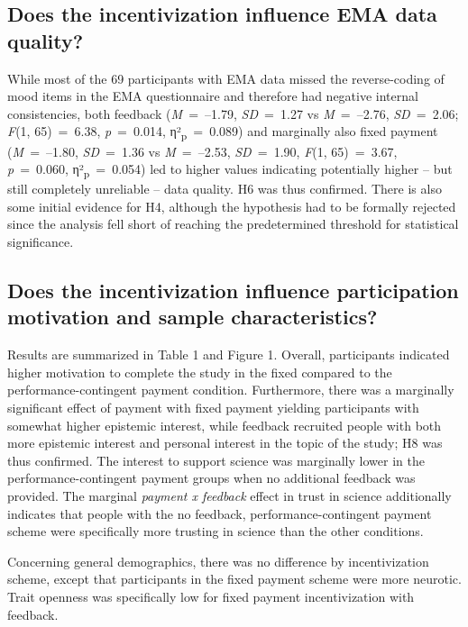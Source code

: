 \documentclass[authordate, empirical,issue]{jote-new-article}
\begin{document}
	\subsection{Does the incentivization influence EMA data quality?}



	While most of the 69 participants with EMA data missed the reverse-coding of mood items in the EMA questionnaire and therefore had negative internal consistencies, both feedback (\emph{M }= --1.79, \emph{SD }= 1.27 vs \emph{M }= --2.76, \emph{SD }= 2.06; \emph{F}(1, 65) = 6.38, \emph{p} = 0.014, η²\textsubscript{p} = 0.089) and marginally also fixed payment (\emph{M }= --1.80, \emph{SD }= 1.36 vs \emph{M }= --2.53, \emph{SD }= 1.90, \emph{F}(1, 65) = 3.67, \emph{p} = 0.060, η²\textsubscript{p} = 0.054) led to higher values indicating potentially higher -- but still completely unreliable -- data quality. H6 was thus confirmed. There is also some initial evidence for H4, although the hypothesis had to be formally rejected since the analysis fell short of reaching the predetermined threshold for statistical significance.



	\subsection{Does the incentivization influence participation motivation and sample characteristics?}



	Results are summarized in Table 1 and Figure 1. Overall, participants indicated higher motivation to complete the study in the fixed compared to the performance-contingent payment condition. Furthermore, there was a marginally significant effect of payment with fixed payment yielding participants with somewhat higher epistemic interest, while feedback recruited people with both more epistemic interest and personal interest in the topic of the study; H8 was thus confirmed. The interest to support science was marginally lower in the performance-contingent payment groups when no additional feedback was provided. The marginal \emph{payment x feedback }effect in trust in science additionally indicates that people with the no feedback, performance-contingent payment scheme were specifically more trusting in science than the other conditions.



	Concerning general demographics, there was no difference by incentivization scheme, except that participants in the fixed payment scheme were more neurotic. Trait openness was specifically low for fixed payment incentivization with feedback.
\end{document}

